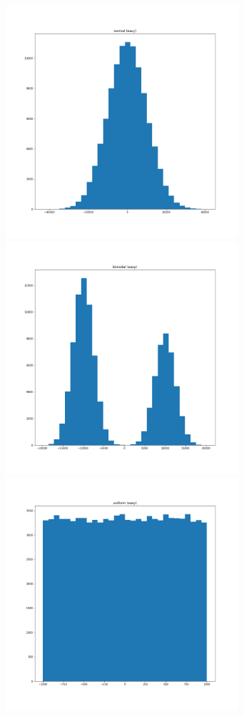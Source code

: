 \documentclass[11pt]{article}
\begin{document}
\includegraphics[width=3.4in]{normal (easy).png}
\includegraphics[width=3.4in]{bimodal (easy).png}
\includegraphics[width=3.4in]{uniform (easy).png} \\
\end{document}
